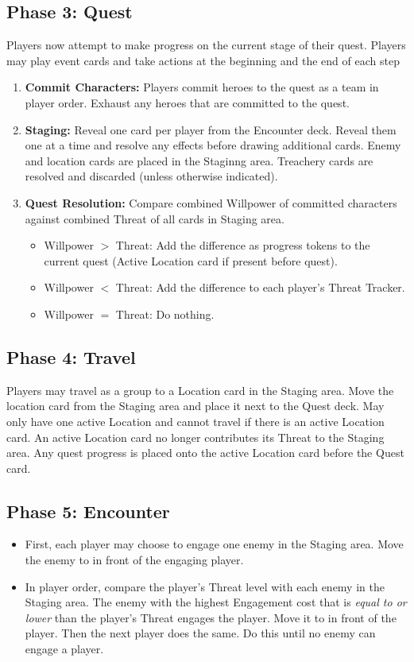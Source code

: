 \documentclass[12pt]{article}
\newenvironment{enumerateCustom}
{\begin{enumerate}
  \setlength{\itemsep}{1pt}
  \setlength{\parskip}{0pt}
  \setlength{\parsep}{0pt}}
{\end{enumerate}}
\newenvironment{itemizeCustom}
{\begin{itemize}
  \setlength{\itemsep}{1pt}
  \setlength{\parskip}{0pt}
  \setlength{\parsep}{0pt}}
{\end{itemize}}
\begin{document}
\begin{multicols*}{2}
\subsection*{Phase 3: Quest}
Players now attempt to make progress on the current stage of their quest. Players may play event cards and take actions at the beginning and the end of each step
\begin{enumerateCustom}
	\item \textbf{Commit Characters:} Players commit heroes to the quest as a team in player order. Exhaust any heroes that are committed to the quest.
	\item \textbf{Staging:}  Reveal one card per player from the Encounter deck. Reveal them one at a time and resolve any effects before drawing additional cards. Enemy and location cards are placed in the Staginng area. Treachery cards are resolved and discarded (unless otherwise indicated).
	\item \textbf{Quest Resolution:} Compare combined Willpower of committed characters against combined Threat of all cards in Staging area.
		\begin{itemizeCustom}
			\item Willpower $>$ Threat: Add the difference as progress tokens to the current quest (Active Location card if present before quest).
			\item Willpower $<$ Threat: Add the difference to each player's Threat Tracker.
			\item Willpower $=$ Threat: Do nothing.
		\end{itemizeCustom}
\end{enumerateCustom}

\subsection*{Phase 4: Travel}
Players may travel as a group to a Location card in the Staging area. Move the location card from the Staging area and place it next to the Quest deck. May only have one active Location and cannot travel if there is an active Location card. An active Location card no longer contributes its Threat to the Staging area. Any quest progress is placed onto the active Location card before the Quest card.

\subsection*{Phase 5: Encounter}
\begin{itemizeCustom}
	\item First, each player may choose to engage one enemy in the Staging area. Move the enemy to in front of the engaging player.
	\item In player order, compare the player's Threat level with each enemy in the Staging area. The enemy with the highest Engagement cost that is \emph{equal to or lower} than the player's Threat engages the player. Move it to in front of the player. Then the next player does the same. Do this until no enemy can engage a player.
\end{itemizeCustom}


\end{multicols*}
\end{document}
